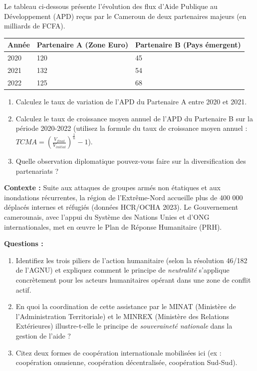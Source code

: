 \documentclass[11pt]{article}
\newcounter{popsec}
\newcounter{popsub}
\newcommand{\courssub}[1]{%
  \stepcounter{popsub}%
  \par\vspace{9pt}\noindent{\popxbold\fontsize{11.5}{13}\selectfont\color{popink}{\color{poporange}\thepopsec.\thepopsub}\hspace{6pt}#1}\par\nopagebreak\vspace{4pt}
}
\begin{document}
\begin{exercice}
Le tableau ci-dessous présente l'évolution des flux d'Aide Publique au Développement (APD) reçus par le Cameroun de deux partenaires majeurs (en milliards de FCFA).

\begin{center}
\begin{tabularx}{\linewidth}{|l|X|X|}\hline
\textbf{Année} & \textbf{Partenaire A (Zone Euro)} & \textbf{Partenaire B (Pays émergent)} \\ \hline
2020 & 120 & 45 \\ \hline
2021 & 132 & 54 \\ \hline
2022 & 125 & 68 \\ \hline
\end{tabularx}
\end{center}

\begin{enumerate}
    \item Calculez le taux de variation de l'APD du Partenaire A entre 2020 et 2021.
    \item Calculez le taux de croissance moyen annuel de l'APD du Partenaire B sur la période 2020-2022 (utilisez la formule du taux de croissance moyen annuel : $TCMA = \left(\frac{V_{final}}{V_{initial}}\right)^{\frac{1}{n}} - 1$).
    \item Quelle observation diplomatique pouvez-vous faire sur la diversification des partenariats ?
\end{enumerate}
\end{exercice}

\courssub{Je m'entraîne}

\begin{exercice}
\textbf{Contexte :} Suite aux attaques de groupes armés non étatiques et aux inondations récurrentes, la région de l'Extrême-Nord accueille plus de 400 000 déplacés internes et réfugiés (données HCR/OCHA 2023). Le Gouvernement camerounais, avec l'appui du Système des Nations Unies et d'ONG internationales, met en œuvre le Plan de Réponse Humanitaire (PRH).

\textbf{Questions :}
\begin{enumerate}
    \item Identifiez les trois piliers de l'action humanitaire (selon la résolution 46/182 de l'AGNU) et expliquez comment le principe de \emph{neutralité} s'applique concrètement pour les acteurs humanitaires opérant dans une zone de conflit actif.
    \item En quoi la coordination de cette assistance par le MINAT (Ministère de l'Administration Territoriale) et le MINREX (Ministère des Relations Extérieures) illustre-t-elle le principe de \emph{souveraineté nationale} dans la gestion de l'aide ?
    \item Citez deux formes de coopération internationale mobilisées ici (ex : coopération onusienne, coopération décentralisée, coopération Sud-Sud).
\end{enumerate}
\end{exercice}
\end{document}
